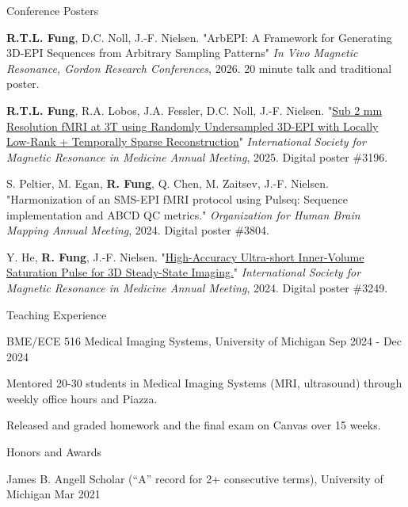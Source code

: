\documentclass{resume}
\begin{document}
\begin{rSection}{Conference Posters}
\begin{rConference}
    \item \textbf{R.T.L. Fung}, D.C. Noll, J.-F. Nielsen.
    "ArbEPI: A Framework for Generating 3D-EPI Sequences from Arbitrary Sampling Patterns"
    \textit{In Vivo Magnetic Resonance, Gordon Research Conferences}, 2026. 20 minute talk and traditional poster.

    \item \textbf{R.T.L. Fung}, R.A. Lobos, J.A. Fessler, D.C. Noll, J.-F. Nielsen.
    "\href{https://archive.ismrm.org/2025/3196.html}{Sub 2 mm Resolution fMRI at 3T using Randomly Undersampled 3D-EPI with Locally Low-Rank + Temporally Sparse Reconstruction}"
    \textit{International Society for Magnetic Resonance in Medicine Annual Meeting}, 2025. Digital poster \#3196.

    \item S. Peltier, M. Egan, \textbf{R. Fung}, Q. Chen, M. Zaitsev, J.-F. Nielsen.
    "Harmonization of an SMS-EPI fMRI protocol using Pulseq: Sequence implementation and ABCD QC metrics."
    \textit{Organization for Human Brain Mapping Annual Meeting}, 2024. Digital poster \#3804.

    \item Y. He, \textbf{R. Fung}, J.-F. Nielsen.
    "\href{https://archive.ismrm.org/2024/3249.html}{High-Accuracy Ultra-short Inner-Volume Saturation Pulse for 3D Steady-State Imaging.}"
    \textit{International Society for Magnetic Resonance in Medicine Annual Meeting}, 2024. Digital poster \#3249.
\end{rConference}
\end{rSection}

\begin{rSection}{Teaching Experience}
    \begin{rSubsection}{BME/ECE 516 Medical Imaging Systems}{, University of Michigan \hfill {Sep 2024 - Dec 2024}}
        \item[$\bullet$] Mentored 20-30 students in Medical Imaging Systems (MRI, ultrasound) through weekly office hours and Piazza.
        \item[$\bullet$] Released and graded homework and the final exam on Canvas over 15 weeks.
    \end{rSubsection}
\end{rSection}

\begin{rSection}{Honors and Awards}
	\begin{rSubsection}{James B. Angell Scholar (``A'' record for 2+ consecutive terms)}{, University of Michigan \hfill Mar 2021}
	\end{rSubsection}
\end{rSection}
\end{document}
